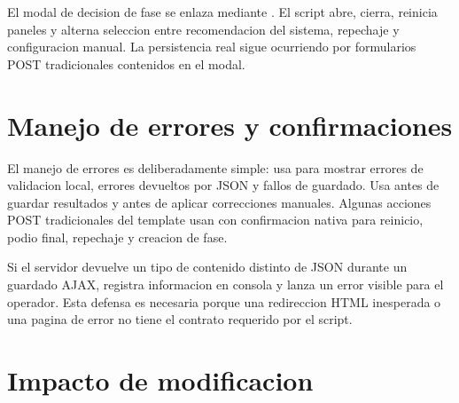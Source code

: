 El modal de decision de fase se enlaza mediante . El script abre, cierra, reinicia paneles y alterna seleccion entre recomendacion del sistema, repechaje y configuracion manual. La persistencia real sigue ocurriendo por formularios POST tradicionales contenidos en el modal.

\section{Manejo de errores y confirmaciones}
\label{sec:javascript-errores-confirmaciones}

El manejo de errores es deliberadamente simple:  usa  para mostrar errores de validacion local, errores devueltos por JSON y fallos de guardado. Usa  antes de guardar resultados y antes de aplicar correcciones manuales. Algunas acciones POST tradicionales del template usan  con confirmacion nativa para reinicio, podio final, repechaje y creacion de fase.

Si el servidor devuelve un tipo de contenido distinto de JSON durante un guardado AJAX,  registra informacion en consola y lanza un error visible para el operador. Esta defensa es necesaria porque una redireccion HTML inesperada o una pagina de error no tiene el contrato  requerido por el script.

\section{Impacto de modificacion}
\label{sec:javascript-impacto-modificacion}


